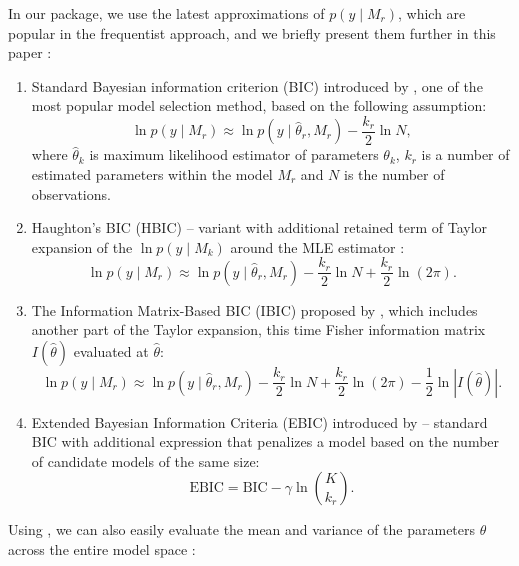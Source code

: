 In our  package, we use the latest approximations
of $p(y \mid M_r)$, which are popular in the frequentist
approach, and we briefly present them further in this paper
\citep[][]{Raftery_1996, Bollen_2012, Bollen_2014, Peterson_2019, Bayarri_2019}: 
\begin{enumerate}
	\item Standard Bayesian information criterion (BIC)
		introduced by \cite{Schwarz_1978}, one of the most
		popular model selection  method, based on the following
		assumption:
		\begin{equation}
			\ln p(y \mid M_r) \approx \ln p(y \mid \hat \theta_r, M_r) - \frac{k_r}{2}\ln N,
			\label{eq: BIC}
		\end{equation}
		where $\hat \theta_k$ is maximum likelihood estimator of
		parameters $\theta_k$, $k_r$ is a number of estimated
		parameters within the model $M_r$ and $N$ is the number
		of observations.
    \item Haughton’s BIC (HBIC) -- variant with additional retained
    	term of Taylor expansion of the $\ln p(y \mid M_k)$
    	around the MLE estimator \citep[][]{Haughton_1988, KassRaftery-BayesFactors-1995}:
	    \begin{equation}
	    	\ln p(y \mid M_r) \approx \ln p(y \mid \hat \theta_r, M_r) - \frac{k_r}{2}\ln N + \frac{k_r}{2}\ln (2\pi).
	    \end{equation}
	\item The Information Matrix-Based BIC (IBIC) proposed by
		\cite{Bollen_2012}, which includes another part of the
		Taylor expansion, this time Fisher information matrix
		$I(\hat \theta)$ evaluated at $\hat \theta$:
		\begin{equation}
			\ln p(y \mid M_r) \approx \ln p(y \mid \hat \theta_r, M_r) - \frac{k_r}{2}\ln N + \frac{k_r}{2}\ln (2\pi) -\frac{1}{2}\ln \left| I(\hat \theta) \right|.
			\label{eq: IBIC}
		\end{equation}
	\item Extended Bayesian Information Criteria (EBIC)
		introduced by \cite{Chen_Chen_2008} -- standard BIC
		with additional expression  that penalizes a model
		based on the number of candidate models of the same size:
		\begin{equation}
			\text{EBIC} = \text{BIC} - \gamma \ln \binom{K}{k_r}.
			\label{eq: EBIC}
		\end{equation}
\end{enumerate}

Using , we can also easily evaluate the mean and
variance of the parameters $\theta$ across the entire model
space \citep[][]{Leamer1978}:

